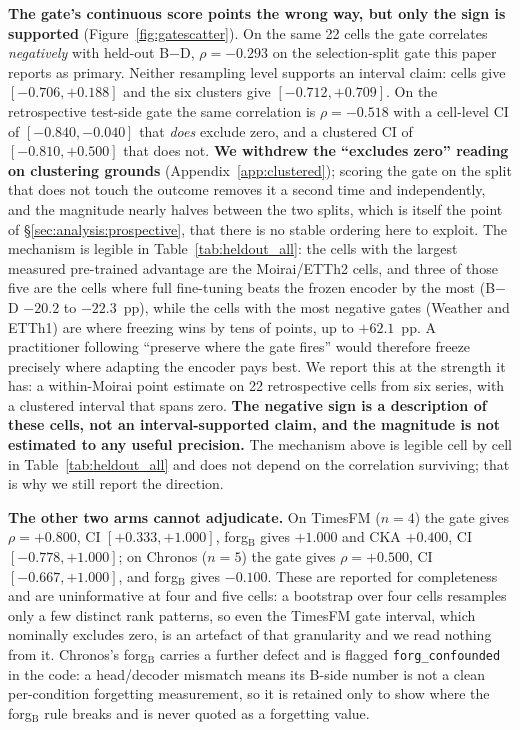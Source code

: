 \textbf{The gate's continuous score points the wrong way, but only the sign is
supported} (Figure~\ref{fig:gatescatter}). On the same 22 cells the gate correlates \emph{negatively} with
held-out B$-$D, $\rho{=}{-}0.293$ on the selection-split gate this paper reports
as primary. Neither resampling level supports an interval claim: cells give
$[-0.706, +0.188]$ and the six clusters give $[-0.712, +0.709]$. On the
retrospective test-side gate the same correlation is $\rho{=}{-}0.518$ with a
cell-level CI of $[-0.840, -0.040]$ that \emph{does} exclude zero, and a clustered
CI of $[-0.810, +0.500]$ that does not. \textbf{We withdrew the ``excludes zero''
reading on clustering grounds} (Appendix~\ref{app:clustered}); scoring the gate on
the split that does not touch the outcome removes it a second time and
independently, and the magnitude nearly halves between the two splits, which is
itself the point of \S\ref{sec:analysis:prospective}, that there is no stable
ordering here to exploit. The
mechanism is legible in Table~\ref{tab:heldout_all}: the cells with the largest
measured pre-trained advantage are the Moirai/ETTh2 cells, and three of those
five are the cells where full fine-tuning beats the frozen encoder by the most
(B$-$D $-20.2$ to $-22.3$~pp), while the cells with the most negative
gates (Weather and ETTh1) are where freezing wins by tens of points, up to
$+62.1$~pp. A practitioner following ``preserve where the gate fires'' would
therefore freeze precisely where adapting the encoder pays best. We report this
at the strength it has: a within-Moirai point estimate on 22 retrospective cells
from six series, with a clustered interval that spans zero. \textbf{The negative
sign is a description of these cells, not an interval-supported claim, and the
magnitude is not estimated to any useful precision.} The mechanism above is
legible cell by cell in Table~\ref{tab:heldout_all} and does not depend on the
correlation surviving; that is why we still report the direction.

\textbf{The other two arms cannot adjudicate.} On TimesFM ($n{=}4$) the gate
gives $\rho{=}{+}0.800$, CI $[+0.333, +1.000]$, forg$_\text{B}$ gives
$+1.000$ and CKA $+0.400$, CI $[-0.778, +1.000]$; on Chronos ($n{=}5$) the gate
gives $\rho{=}{+}0.500$, CI $[-0.667, +1.000]$, and forg$_\text{B}$ gives
$-0.100$. These are reported for completeness and are uninformative at four and
five cells: a bootstrap over four cells resamples only a few distinct rank
patterns, so even the TimesFM gate interval, which nominally excludes zero, is
an artefact of that granularity and we read nothing from it. Chronos's
forg$_\text{B}$ carries a further defect and is flagged
\texttt{forg\_confounded} in the code: a head/decoder mismatch means its B-side
number is not a clean per-condition forgetting measurement, so it is retained
only to show where the forg$_\text{B}$ rule breaks and is never quoted as a
forgetting value.

